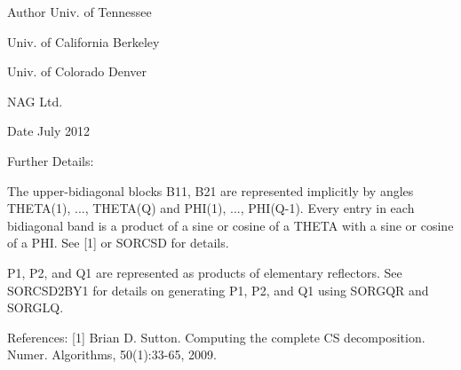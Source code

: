 \begin{DoxyAuthor}{Author}
Univ. of Tennessee 

Univ. of California Berkeley 

Univ. of Colorado Denver 

N\+A\+G Ltd. 
\end{DoxyAuthor}
\begin{DoxyDate}{Date}
July 2012 
\end{DoxyDate}
\begin{DoxyParagraph}{Further Details\+: }
\begin{DoxyVerb}  The upper-bidiagonal blocks B11, B21 are represented implicitly by
  angles THETA(1), ..., THETA(Q) and PHI(1), ..., PHI(Q-1). Every entry
  in each bidiagonal band is a product of a sine or cosine of a THETA
  with a sine or cosine of a PHI. See [1] or SORCSD for details.

  P1, P2, and Q1 are represented as products of elementary reflectors.
  See SORCSD2BY1 for details on generating P1, P2, and Q1 using SORGQR
  and SORGLQ.\end{DoxyVerb}
 
\end{DoxyParagraph}
\begin{DoxyParagraph}{References\+: }
\mbox{[}1\mbox{]} Brian D. Sutton. Computing the complete C\+S decomposition. Numer. Algorithms, 50(1)\+:33-\/65, 2009. 
\end{DoxyParagraph}
